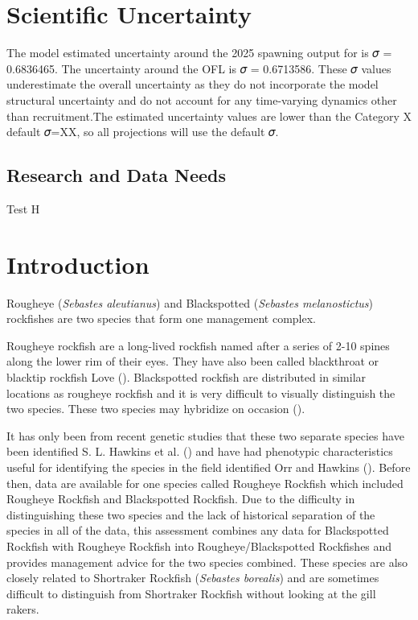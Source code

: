 \documentclass[
]{scrartcl}
\begin{document}
\section{Scientific Uncertainty}\label{scientific-uncertainty}

The model estimated uncertainty around the 2025 spawning output for is 𝜎
= 0.6836465. The uncertainty around the OFL is 𝜎 = 0.6713586. These 𝜎
values underestimate the overall uncertainty as they do not incorporate
the model structural uncertainty and do not account for any time-varying
dynamics other than recruitment.The estimated uncertainty values are
lower than the Category X default 𝜎=XX, so all projections will use the
default 𝜎.

\subsection{Research and Data Needs}\label{research-and-data-needs}

Test H

\newpage{}

\setlength{\parskip}{5mm plus1mm minus1mm}
\setcounter{page}{1}
\setcounter{section}{0}
\renewcommand{\thefigure}{\arabic{figure}}
\renewcommand{\thetable}{\arabic{table}}

\section{Introduction}\label{introduction}

Rougheye (\emph{Sebastes aleutianus}) and Blackspotted (\emph{Sebastes
melanostictus}) rockfishes are two species that form one management
complex.

Rougheye rockfish are a long-lived rockfish named after a series of 2-10
spines along the lower rim of their eyes. They have also been called
blackthroat or blacktip rockfish Love
(). Blackspotted rockfish are
distributed in similar locations as rougheye rockfish and it is very
difficult to visually distinguish the two species. These two species may
hybridize on occasion ().

It has only been from recent genetic studies that these two separate
species have been identified S. L. Hawkins et al.
() and have had phenotypic
characteristics useful for identifying the species in the field
identified Orr and Hawkins ().
Before then, data are available for one species called Rougheye Rockfish
which included Rougheye Rockfish and Blackspotted Rockfish. Due to the
difficulty in distinguishing these two species and the lack of
historical separation of the species in all of the data, this assessment
combines any data for Blackspotted Rockfish with Rougheye Rockfish into
Rougheye/Blackspotted Rockfishes and provides management advice for the
two species combined. These species are also closely related to
Shortraker Rockfish (\emph{Sebastes borealis}) and are sometimes
difficult to distinguish from Shortraker Rockfish without looking at the
gill rakers.
\end{document}
